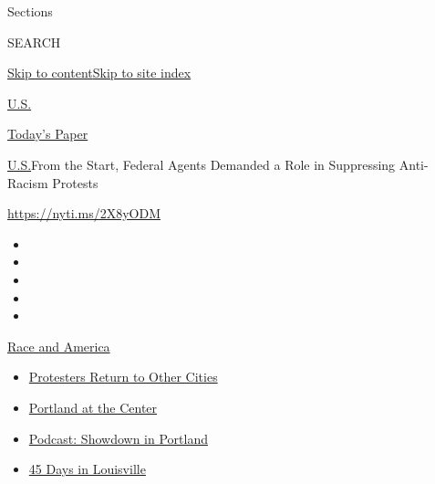 Sections

SEARCH

\protect\hyperlink{site-content}{Skip to
content}\protect\hyperlink{site-index}{Skip to site index}

\href{https://www.nytimes3xbfgragh.onion/section/us}{U.S.}

\href{https://myaccount.nytimes3xbfgragh.onion/auth/login?response_type=cookie\&client_id=vi}{}

\href{https://www.nytimes3xbfgragh.onion/section/todayspaper}{Today's
Paper}

\href{/section/us}{U.S.}\textbar{}From the Start, Federal Agents
Demanded a Role in Suppressing Anti-Racism Protests

\url{https://nyti.ms/2X8yODM}

\begin{itemize}
\item
\item
\item
\item
\item
\end{itemize}

\href{https://www.nytimes3xbfgragh.onion/news-event/george-floyd-protests-minneapolis-new-york-los-angeles?action=click\&pgtype=Article\&state=default\&region=TOP_BANNER\&context=storylines_menu}{Race
and America}

\begin{itemize}
\tightlist
\item
  \href{https://www.nytimes3xbfgragh.onion/2020/07/26/us/protests-portland-seattle-trump.html?action=click\&pgtype=Article\&state=default\&region=TOP_BANNER\&context=storylines_menu}{Protesters
  Return to Other Cities}
\item
  \href{https://www.nytimes3xbfgragh.onion/2020/07/24/us/portland-oregon-protests-white-race.html?action=click\&pgtype=Article\&state=default\&region=TOP_BANNER\&context=storylines_menu}{Portland
  at the Center}
\item
  \href{https://www.nytimes3xbfgragh.onion/2020/07/23/podcasts/the-daily/portland-protests.html?action=click\&pgtype=Article\&state=default\&region=TOP_BANNER\&context=storylines_menu}{Podcast:
  Showdown in Portland}
\item
  \href{https://www.nytimes3xbfgragh.onion/interactive/2020/07/16/us/black-lives-matter-protests-louisville-breonna-taylor.html?action=click\&pgtype=Article\&state=default\&region=TOP_BANNER\&context=storylines_menu}{45
  Days in Louisville}
\end{itemize}


